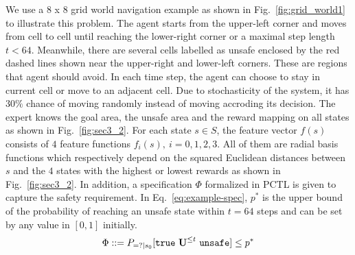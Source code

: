 We use a 8 x 8 grid world navigation example as shown in Fig.~\ref{fig:grid_world1} to illustrate this problem. The agent starts from the upper-left corner and moves from cell to cell until reaching the lower-right corner or a maximal step length $t<64$. Meanwhile, there are several cells labelled as unsafe enclosed by the red dashed lines shown near the upper-right and lower-left corners. These are regions that agent should avoid. 
In each time step, the agent can choose to stay in current cell or move to an adjacent cell. Due to stochasticity of the system, it has $30\%$ chance of moving randomly instead of moving accroding its decision. 
The expert knows the goal area, the unsafe area and the reward mapping on all states as shown in Fig.~\ref{fig:sec3_2}. For each state $s\in S$, the feature vector $f(s)$ consists of $4$ feature functions $f_i(s),\ i = 0, 1, 2, 3$. All of them are radial basis functions which respectively depend on the squared Euclidean distances between $s$ and the $4$ states with the highest or lowest rewards as shown in Fig.~\ref{fig:sec3_2}. In addition, a specification $\Phi$ formalized in PCTL is given to capture the safety requirement. In Eq.~\ref{eq:example-spec}, $p^*$ is the upper bound of the probability of reaching an unsafe state within $t=64$ steps and can be set by any value in $[0, 1]$ initially.
\begin{equation}
\Phi ::= P_{=?|s_0}[\true\ \until^{\leq t}\ \texttt{unsafe}]\leq p^*
\label{eq:example-spec}
\end{equation}

